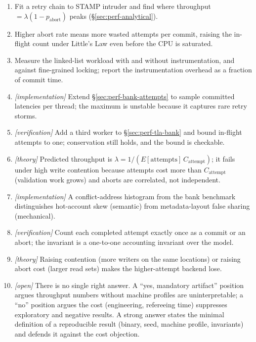 \begin{enumerate}
    \item Fit a retry chain to STAMP intruder and find where throughput
          $= \lambda(1-p_{\mathrm{abort}})$ peaks
          (\S\ref{sec:perf-analytical}).
    \item Higher abort rate means more wasted attempts per commit, raising
          the in-flight count under Little's Law even before the CPU is
          saturated.
    \item Measure the linked-list workload with and without instrumentation,
          and against fine-grained locking; report the instrumentation
          overhead as a fraction of commit time.
    \item \emph{[implementation]} Extend \S\ref{sec:perf-bank-attempts} to
          sample committed latencies per thread; the maximum is unstable
          because it captures rare retry storms.
    \item \emph{[verification]} Add a third worker to
          \S\ref{sec:perf-tla-bank} and bound in-flight attempts to one;
          conservation still holds, and the bound is checkable.
    \item \emph{[theory]} Predicted throughput is
          $\lambda = 1/(E[\mathrm{attempts}]\,C_{\mathrm{attempt}})$; it
          fails under high write contention because attempts cost more than
          $C_{\mathrm{attempt}}$ (validation work grows) and aborts are
          correlated, not independent.
    \item \emph{[implementation]} A conflict-address histogram from the bank
          benchmark distinguishes hot-account skew (semantic) from
          metadata-layout false sharing (mechanical).
    \item \emph{[verification]} Count each completed attempt exactly once as
          a commit or an abort; the invariant is a one-to-one accounting
          invariant over the model.
    \item \emph{[theory]} Raising contention (more writers on the same
          locations) or raising abort cost (larger read sets) makes the
          higher-attempt backend lose.
    \item \emph{[open]} There is no single right answer.  A ``yes, mandatory
          artifact'' position argues throughput numbers without machine
          profiles are uninterpretable; a ``no'' position argues the cost
          (engineering, refereeing time) suppresses exploratory and negative
          results.  A strong answer states the minimal definition of a
          reproducible result (binary, seed, machine profile, invariants)
          and defends it against the cost objection.
\end{enumerate}

